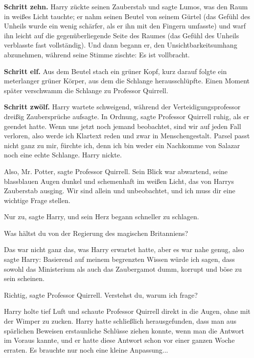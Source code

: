 \textbf{Schritt zehn.}
Harry zückte seinen Zauberstab und sagte \glqq{}Lumos\grqq{}, was den Raum in
weißes Licht tauchte; er nahm seinen Beutel von seinem Gürtel (das Gefühl des
Unheils wurde ein wenig schärfer, als er ihn mit den Fingern umfasste) und warf
ihn leicht auf die gegenüberliegende Seite des Raumes (das Gefühl des Unheils
verblasste fast vollständig). Und dann begann er, den Unsichtbarkeitsumhang
abzunehmen, während seine Stimme zischte: \glqq{}Es ist vollbracht.\grqq{}

\textbf{Schritt elf.}
Aus dem Beutel stach ein grüner Kopf, kurz darauf folgte ein meterlanger grüner
Körper, aus dem die Schlange herausschlüpfte. Einen Moment später verschwamm die
Schlange zu Professor Quirrell.

\textbf{Schritt zwölf.}
Harry wartete schweigend, während der Verteidigungsprofessor dreißig
Zaubersprüche aufsagte. \glqq{}In Ordnung\grqq{}, sagte Professor Quirrell ruhig,
als er geendet hatte. \glqq{}Wenn uns jetzt noch jemand beobachtet, sind wir auf
jeden Fall verloren, also werde ich Klartext reden und zwar in Menschengestalt.
Parsel passt nicht ganz zu mir, fürchte ich, denn ich bin weder ein Nachkomme
von Salazar noch eine echte Schlange.\grqq{} Harry nickte.

\glqq{}Also, Mr. Potter\grqq{}, sagte Professor Quirrell. Sein Blick war
abwartend, seine blassblauen Augen dunkel und schemenhaft im weißen Licht, das
von Harrys Zauberstab ausging. \glqq{}Wir sind allein und unbeobachtet, und ich
muss dir eine wichtige Frage stellen.\grqq{}

\glqq{}Nur zu\grqq{}, sagte Harry, und sein Herz begann schneller zu schlagen.

\glqq{}Was hältst du von der Regierung des magischen Britanniens?\grqq{}

Das war nicht ganz das, was Harry erwartet hatte, aber es war nahe genug, also
sagte Harry: \glqq{}Basierend auf meinem begrenzten Wissen würde ich sagen, dass
sowohl das Ministerium als auch das Zaubergamot dumm, korrupt und böse zu sein
scheinen.\grqq{}

\glqq{}Richtig\grqq{}, sagte Professor Quirrell. \glqq{}Verstehst du, warum ich
frage?\grqq{}

Harry holte tief Luft und schaute Professor Quirrell direkt in die Augen, ohne
mit der Wimper zu zucken. Harry hatte schließlich herausgefunden, dass man aus
spärlichen Beweisen erstaunliche Schlüsse ziehen konnte, wenn man die Antwort im
Voraus kannte, und er hatte diese Antwort schon vor einer ganzen Woche erraten.
Es brauchte nur noch eine kleine Anpassung...

